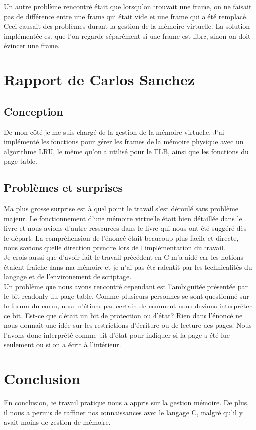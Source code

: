 \documentclass{article}
\begin{document}
	Un autre problème rencontré était que lorsqu'on trouvait une frame, on ne faisait pas de différence entre une frame qui était vide et une frame qui a été remplacé. Ceci causait des problèmes durant la gestion de la mémoire virtuelle. La solution implémentée est que l'on regarde séparément si une frame est libre, sinon on doit évincer une frame.
	
	\newpage
	\section{Rapport de Carlos Sanchez}
	
	\subsection*{Conception}
	\indent De mon côté je me suis chargé de la gestion de la mémoire virtuelle. J'ai implémenté les fonctions pour gérer les frames de la mémoire physique avec un algorithme LRU, le même qu'on a utilisé pour le TLB, ainsi que les fonctions du page table.\\
	
	\subsection*{Problèmes et surprises}
	\indent Ma plus grosse surprise est à quel point le travail s'est déroulé sans problème majeur. Le fonctionnement d'une mémoire virtuelle était bien détaillée dans le livre et nous avions d'autre ressources dans le livre qui nous ont été suggéré dès le départ. La compréhension de l'énoncé était beaucoup plus facile et directe, nous savions quelle direction prendre lors de l'implémentation du travail. \\
	
	\indent Je crois aussi que d'avoir fait le travail précédent en C m'a aidé car les notions étaient fraîche dans ma mémoire et je n'ai pas été ralentit par les technicalités du langage et de l'environement de scriptage.\\

	\indent Un problème que nous avons rencontré cependant est l'ambiguitée présentée par le bit readonly du page table. Comme plusieurs personnes se sont questionné sur le forum du cours, nous n'étions pas certain de comment nous devions interpréter ce bit. Est-ce que c'était un bit de protection ou d'état? Rien dans l'énoncé ne nous donnait une idée sur les restrictions d'écriture ou de lecture des pages. Nous l'avons donc interprété comme bit d'état pour indiquer si la page a été lue seulement ou si on a écrit à l'intérieur.

	
	\section{Conclusion}
	En conclusion, ce travail pratique nous a appris sur la gestion mémoire. De plus, il nous a permis de raffiner nos connaissances avec le langage C, malgré qu'il y avait moins de gestion de mémoire.  
\end{document}
